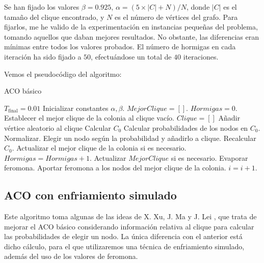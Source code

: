 Se han fijado los valores $\beta = 0.925$, $\alpha = (5 \times |C| + N) / N$, donde
$|C|$ es el tamaño del clique encontrado, y $N$ es el número de vértices del grafo.
Para fijarlos, me he valido de la experimentación en instancias pequeñas del problema,
tomando aquellos que daban mejores resultados. No obstante, las diferencias eran
mínimas entre todos los valores probados. El número de hormigas en cada iteración
ha sido fijado a $50$, efectuándose un total de $40$ iteraciones.

Vemos el pseudocódigo del algoritmo:

\begin{algorithm}[H]
\caption{ACO básico}
  \begin{algorithmic}
    \State $T_{\text{final}} = 0.01$
    \State Inicializar constantes $\alpha, \beta$.
    \State $Mejor Clique = []$.
    \Repeat
      \State $Hormigas = 0$.
      \State Establecer el mejor clique de la colonia al clique vacío.
      \Repeat
        \State $Clique = []$
        \State Añadir vértice aleatorio al clique
        \State Calcular $C_0$
        \Repeat
          \State Calcular probabilidades de los nodos en $C_0$. Normalizar.
          \State Elegir un nodo según la probabilidad y añadirlo a clique.
          \State Recalcular $C_0$.
        \State Actualizar el mejor clique de la colonia si es necesario.
        \State $Hormigas = Hormigas + 1$.
      \State Actualizar $Mejor Clique$ si es necesario.
      \State Evaporar feromona.
      \State Aportar feromona a los nodos del mejor clique de la colonia.
      \State $i = i+1$.
  \EndFunction
  \end{algorithmic}
\end{algorithm}


\subsection{ACO con enfriamiento simulado}\label{aco-sa}

Este algoritmo toma algunas de las ideas de X. Xu, J. Ma y J. Lei \citep{xu:2007},
que trata de mejorar el ACO básico considerando información relativa al clique
para calcular las probabilidades de elegir un nodo. La única diferencia con el
anterior está dicho cálculo, para el que utilizaremos una técnica de enfriamiento
simulado, además del uso de los valores de feromona.

